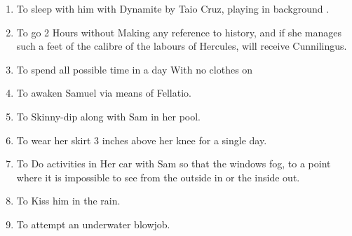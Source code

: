 \begin{enumerate}
\item  To sleep with him with Dynamite by Taio Cruz, playing in background .

\item  To go 2 Hours without Making any reference to history, and if she manages such a feet of the calibre of the labours of Hercules, will receive Cunnilingus. 

\item  To spend all possible time in a day With no clothes on

\item  To awaken Samuel via means of Fellatio.

\item  To Skinny-dip along with Sam in her pool.

\item  To wear her skirt 3 inches above her knee for a single day.

\item  To Do activities in Her car with Sam so that the windows fog, to a point where it is impossible to see from the outside in or the inside out.

\item  To Kiss him in the rain.

\item To attempt an underwater blowjob.

\end{enumerate}
